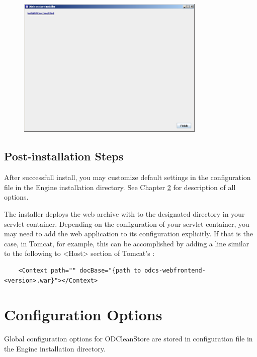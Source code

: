 \FloatBarrier

\begin{figure}[!h]
    \centering
    \includegraphics[width=0.8\textwidth]{images/install-step11.png}
\end{figure}

\FloatBarrier

\section{Post-installation Steps}
After successfull install, you may customize default \odcs settings in the configuration file  in the Engine installation directory. See Chapter \ref{chap:configOptions} for description of all options.

The installer deploys the web archive with \FE to the designated directory in your servlet container. Depending on the configuration of your servlet container, you may need to add the \FE web application to its configuration explicitly. If that is the case, in Tomcat, for example, this can be accomplished by adding a line similar to the following to <Host> section of Tomcat's :  
\begin{verbatim} 
    <Context path="" docBase="{path to odcs-webfrontend-<version>.war}"></Context>
\end{verbatim} 


\chapter{Configuration Options}
 \label{chap:configOptions}
Global configuration options for ODCleanStore are stored in configuration file  in the Engine installation directory.


